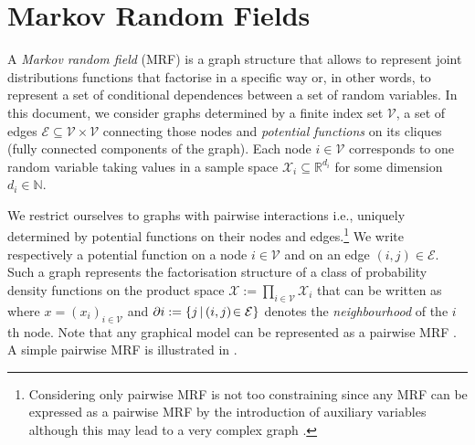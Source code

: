 \section{\label{subsection: mrf}Markov Random Fields}
A \emph{Markov random field} (MRF) is a graph structure that allows to represent joint distributions functions that factorise in a specific way or, in other words, to represent a set of conditional dependences between a set of random variables. In this document, we consider graphs determined by a finite index set $\mathcal V$, a set of edges $\mathcal E\subseteq \mathcal V\times \mathcal V$ connecting those nodes and \emph{potential functions} on its cliques (fully connected components of the graph). Each node $i\in\mathcal V$ corresponds to one random variable taking values in a sample space $\mathcal X_i \subseteq\mathbb R^{d_i}$ for some dimension $d_i\in\mathbb N$. 

We restrict ourselves to graphs with pairwise interactions i.e., uniquely determined by potential functions on their nodes and edges.\footnote{Considering only pairwise MRF is not too constraining since any MRF can be expressed as a pairwise MRF by the introduction of auxiliary variables although this may lead to a very complex graph \citet{wainwright08}.}
We write
%
% 
respectively a potential function on a node $i\in \mathcal V$ and on an edge $(i,j)\in \mathcal E$. 
Such a graph represents the factorisation structure of a class of probability density functions on the product space $\mathcal X := \prod_{i\in \mathcal V}\mathcal X_{i}$ that can be written as
where $x=(x_{i})_{i\in \mathcal V}$ and $\partial i:=\{j\,|\, (i,j)\!\in\,\!\mathcal E\}$ denotes the \emph{neighbourhood} of the $i$th node. Note that any graphical model can be represented as a pairwise MRF \citep{yedidia00}. 
A simple pairwise MRF is illustrated in .\\

